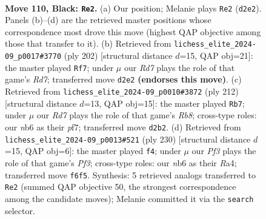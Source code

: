 \documentclass[11pt]{article}
\begin{document}
\clearpage

\begin{figure}[p]\centering
\begin{subfigure}{0.46\textwidth}\centering
\resizebox{\linewidth}{!}{%
\newchessgame
\chessboard[
  setfen={8/R5p1/1N3pk1/7p/7P/6PK/3r4/8 b - - 45 110},
  showmover=false,
  pgfstyle=straightmove, color=movearrow, markmove={d2-e2}
]}
\caption{}
\end{subfigure}\hfill
\begin{subfigure}{0.46\textwidth}\centering
\resizebox{\linewidth}{!}{%
\newchessgame
\chessboard[
  setfen={8/3R4/6pk/7p/7P/2r3PK/8/8 w - - 40 102},
  showmover=false,
  pgfstyle=straightmove, color=movearrow, markmove={d7-f7}
]}
\caption{}
\end{subfigure}
\\[4pt]
\begin{subfigure}{0.46\textwidth}\centering
\resizebox{\linewidth}{!}{%
\newchessgame
\chessboard[
  setfen={1R6/5pk1/6p1/4P2p/5K1P/5PP1/8/4r3 w - - 5 107},
  showmover=false,
  pgfstyle=straightmove, color=movearrow, markmove={b8-b7}
]}
\caption{}
\end{subfigure}\hfill
\begin{subfigure}{0.46\textwidth}\centering
\resizebox{\linewidth}{!}{%
\newchessgame
\chessboard[
  setfen={8/1r6/6pk/7p/R6P/5PP1/5K2/8 w - - 41 116},
  showmover=false,
  pgfstyle=straightmove, color=movearrow, markmove={f3-f4}
]}
\caption{}
\end{subfigure}
\caption{\textbf{Move 110, Black: \texttt{Re2}.} (a) Our position; Melanie plays \texttt{Re2} (\texttt{d2e2}). Panels (b)--(d) are the retrieved master positions whose correspondence most drove this move (highest QAP objective among those that transfer to it). (b) Retrieved from \texttt{lichess\_elite\_2024-09\_p0017\#3770} (ply 202) [structural distance $d$=15, QAP obj=21]: the master played \texttt{Rf7}; under $\mu$ our \emph{Rd7} plays the role of that game's \emph{Rd7}; transferred move \texttt{d2e2} \textbf{(endorses this move)}. (c) Retrieved from \texttt{lichess\_elite\_2024-09\_p0010\#3872} (ply 212) [structural distance $d$=13, QAP obj=15]: the master played \texttt{Rb7}; under $\mu$ our \emph{Rd7} plays the role of that game's \emph{Rb8}; cross-type roles: our \emph{n}b6 as their \emph{p}f7; transferred move \texttt{d2b2}. (d) Retrieved from \texttt{lichess\_elite\_2024-09\_p0013\#521} (ply 230) [structural distance $d$=15, QAP obj=6]: the master played \texttt{f4}; under $\mu$ our \emph{Pf3} plays the role of that game's \emph{Pf3}; cross-type roles: our \emph{n}b6 as their \emph{R}a4; transferred move \texttt{f6f5}. Synthesis: 5 retrieved analogs transferred to \texttt{Re2} (summed QAP objective 50, the strongest correspondence among the candidate moves); Melanie committed it via the \texttt{search} selector.}
\label{fig:thought-m219}
\end{figure}
\end{document}
